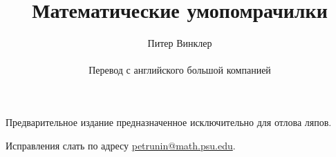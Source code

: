 \documentclass[twoside]{book}
\def\thetitle{Математические умопомрачилки} %
\def\theauthor{Питер Винклер}
\begin{document}

\title{\thetitle}
\author{\theauthor\\
\\
Перевод с английского большой компанией}
\date{}
\maketitle

\thispagestyle{empty}

Предварительное издание предназначенное исключительно для отлова ляпов. 

Исправления слать по адресу 
\url{petrunin@math.psu.edu}.

\vfill























\appendix

{
\small

\printindex

}

{

\sloppy

\printbibliography[heading=bibintoc]


\fussy

}

\newpage

{

\tableofcontents

}
\end{document}
